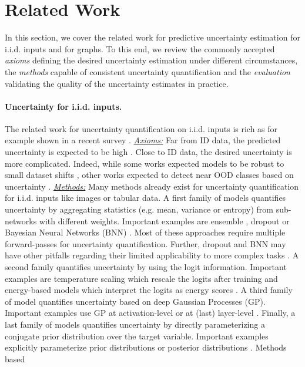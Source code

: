 \section{Related Work}
\label{sec:related_work_009}

In this section, we cover the related work for predictive uncertainty estimation for i.i.d. inputs and for graphs. To this end, we review the commonly accepted \emph{axioms} defining the desired uncertainty estimation under different circumstances, the \emph{methods} capable of consistent uncertainty quantification and the \emph{evaluation} validating the quality of the uncertainty estimates in practice.

\paragraph{Uncertainty for i.i.d. inputs.} The related work for uncertainty quantification on i.i.d. inputs is rich as for example shown in a recent survey \citep{review-uncertainty-dl}. \emph{\underline{Axioms:}} Far from ID data, the predicted uncertainty is expected to be high \citep{provable-uncertainty, NatPN2021, bayesian-a-bit, sufficient-conditions-no-adversarial}. Close to ID data, the desired uncertainty is more complicated. Indeed, while some works expected models to be robust to small dataset shifts \citep{dataset-shift, stutz2020}, other works expected to detect near OOD classes based on uncertainty \citep{contrastive-ood, robustness-uncertainty-dirichlet, attack-detection}. \emph{\underline{Methods:}} Many methods already exist for uncertainty quantification for i.i.d. inputs like images or tabular data. A first family of models quantifies uncertainty by aggregating statistics (e.g. mean, variance or entropy) from sub-networks with different weights. Important examples are ensemble \citep{ensembles, batch-ensembles, hyper-ensembles, mimo-independent-subnetworks}, dropout \citep{Srivastava2014} or Bayesian Neural Networks (BNN) \citep{bayesian-networks, Depeweg2018, simple-baseline-uncertainty, liberty-depth-bnn, rank-1-bnn}. Most of these approaches require multiple forward-passes for uncertainty quantification. Further, dropout and BNN may have other pitfalls regarding their limited applicability to more complex tasks \citep{Osband2016, Hron2018, practical-bnn, expressiveness-bnn}. A second family quantifies uncertainty by using the logit information. Important examples are temperature scaling which rescale the logits after training \citep{calibration-network, Liang2017} and energy-based models which interpret the logits as energy scores \citep{Liu2020a, energy}. A third family of model quantifies uncertainty based on deep Gaussian Processes (GP). Important examples use GP at activation-level \cite{gp-uncertainty-activation} or at (last) layer-level \citep{uncertainty-distance-awareness, bayesian-a-bit, duq,uceloss}. Finally, a last family of models quantifies uncertainty by directly parameterizing a conjugate prior distribution over the target variable. Important examples explicitly parameterize prior distributions \citep{sensoy2018, distribution-distillation, PriorNetworks, reverse-kl, evidential-regression} or posterior distributions \citep{charpentier2020, NatPN2021}. Methods based 